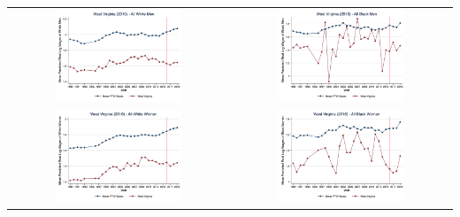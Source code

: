 \documentclass[11pt]{article}
\begin{document}
{\pagebreak
\begin{landscape}
\begin{table}[h!]
    \centering
    \label{fig:pta_wv}
    \begin{tabular}{c c}
          \includegraphics[width = 0.6\textwidth, keepaspectratio]{figures/pta/fin_wm_wv.png} & \includegraphics[width = 0.6\textwidth, keepaspectratio]{figures/pta/fin_bm_wv.png} \\
          \includegraphics[width = 0.6\textwidth, keepaspectratio]{figures/pta/fin_wf_wv.png} & \includegraphics[width = 0.6\textwidth, keepaspectratio]{figures/pta/fin_bf_wv.png}
    \end{tabular}
\end{table}
\end{landscape}

}
\end{document}
